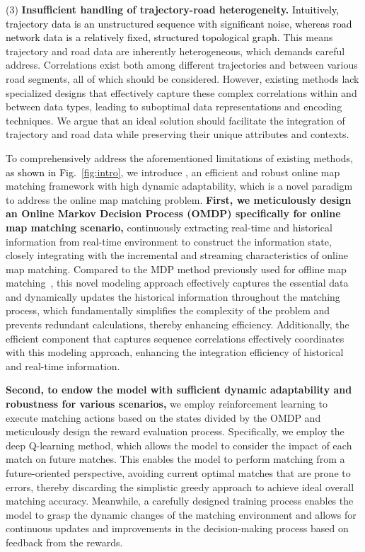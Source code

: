 \noindent (3) \textbf{Insufficient handling of trajectory-road heterogeneity.} \textcolor{black}{Intuitively, trajectory data is an unstructured sequence with significant noise, whereas road network data is a relatively fixed, structured topological graph.} This means trajectory and road data are inherently heterogeneous, which demands careful address. Correlations exist both among different trajectories and between various road segments, all of which should be considered. However, existing methods lack specialized designs that effectively capture these complex correlations within and between data types, leading to suboptimal data representations and encoding techniques. We argue that an ideal solution should facilitate the integration of trajectory and road data while preserving their unique attributes and contexts. 

To comprehensively address the aforementioned limitations of existing methods, \textcolor{black}{as shown in Fig.~\ref{fig:intro}}, we introduce \textbf{\modelName}, an efficient and robust online map matching framework with high dynamic adaptability, which is a novel paradigm to address the online map matching problem.
\textbf{First, we meticulously design an Online Markov Decision Process (OMDP) specifically for online map matching scenario,} continuously extracting real-time and historical information from real-time environment to construct the information state, closely integrating with the incremental and streaming characteristics of online map matching. 
Compared to the MDP method previously used for offline map matching~\cite{MDPMM}, this novel modeling approach effectively captures the essential data and dynamically updates the historical information throughout the matching process, which fundamentally simplifies the complexity of the problem and prevents redundant calculations, thereby enhancing efficiency. Additionally, the efficient component that captures sequence correlations effectively coordinates with this modeling approach, enhancing the integration efficiency of historical and real-time information.

\textbf{Second, to endow the model with sufficient dynamic adaptability and robustness for various scenarios,} we employ reinforcement learning to execute matching actions based on the states divided by the OMDP and meticulously design the reward evaluation process. Specifically, we employ the deep Q-learning method, which allows the model to consider the impact of each match on future matches. This enables the model to perform matching from a future-oriented perspective, avoiding current optimal matches that are prone to errors, thereby discarding the simplistic greedy approach to achieve ideal overall matching accuracy. Meanwhile, a carefully designed training process enables the model to grasp the dynamic changes of the matching environment and allows for continuous updates and improvements in the decision-making process based on feedback from the rewards.

